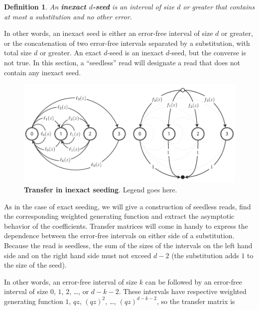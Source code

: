 \documentclass{article}
\newtheorem{definition}{Definition}
\begin{document}
\begin{definition}
\label{def:seed}
An \textbf{inexact $d$-seed} is an interval of size $d$ or greater that
contains at most a substitution and no other error.
\end{definition}

In other words, an inexact seed is either an error-free interval of size
$d$ or greater, or the concatenation of two error-free intervals separated
by a substitution, with total size $d$ or greater. An exact $d$-seed is an
inexact $d$-seed, but the converse is not true. In this section, a
``seedless'' read will designate a read that does not contain any inexact
seed.

\begin{figure}[h]
\centering
\includegraphics[scale=0.88]{inexact_graph.pdf}
\caption{\textbf{Transfer in inexact seeding}.
Legend goes here.}
\label{fig:simulp_fp}
\end{figure}

As in the case of exact seeding, we will give a construction of seedless
reads, find the corresponding weighted generating function and extract the
asymptotic behavior of the coefficients. Transfer matrices will come in
handy to express the dependence between the error-free intervals on either
side of a substitution. Because the read is seedless, the sum of the sizes
of the intervals on the left hand side and on the right hand side must not
exceed $d-2$ (the substitution adds $1$ to the size of the seed).

In other words, an error-free interval of size $k$ can be followed by an
error-free interval of size $0$, $1$, $2$, \ldots, or $d-k-2$. These
intervals have respective weighted generating function $1$, $qz$,
$(qz)^2$, \ldots, $(qz)^{d-k-2}$, so the transfer matrix is
\end{document}
